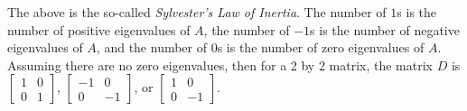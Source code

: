 \documentclass[12pt]{article}
\begin{document}
The above is the so-called \emph{Sylvester's Law of Inertia}.
The number of $1$s is the number of positive eigenvalues of $A$,
the number of $-1$s is the number of negative eigenvalues of $A$,
and
the number of $0$s is the number of zero eigenvalues of $A$.
Assuming there are no zero eigenvalues,
then for a 2 by 2 matrix, the matrix $D$ is
$\left[ \begin{smallmatrix} 1 & 0 \\ 0 & 1 \end{smallmatrix} \right]$,
$\left[ \begin{smallmatrix} -1 & 0 \\ 0 & -1 \end{smallmatrix} \right]$,
or
$\left[ \begin{smallmatrix} 1 & 0 \\ 0 & -1 \end{smallmatrix} \right]$.
\end{document}
